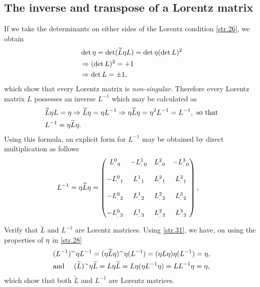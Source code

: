 \begin{small}
\subsection{The inverse and transpose of a Lorentz 
matrix}
If we take the determinants on either sides of the  
Lorentz condition \eqref{str.26}, we obtain
\begin{align}\label{str.30}
&\det {\eta} =\det({\widetilde{L}}{\eta} L) =\det{\ensuremath{{\eta}}}(\det{L})^2 
\notag\\
&\Rightarrow (\det{L} )^2 = +1 \notag \\
&\Rightarrow\det{L}=\pm 1,
\end{align}
which show that every Lorentz matrix is 
\textsl{non-singular}. Therefore every Lorentz matrix 
$L$ possesses an inverse $L^{-1}$ which may be calculated 
as 
\begin{align} \label{str.31}
&\widetilde{L}{\eta} L = {\eta} \Rightarrow \widetilde{L}{\eta} = {\eta}
L^{-1} \Rightarrow {\eta} \widetilde{L} {\eta} = {\eta}^2 L^{-1}
=L^{-1},  \text{ so that}\notag\\
&L^{-1}={\eta}\widetilde{L}{\eta}.
\end{align}
Using this formula, an explicit form for $L^{-1}$ may be 
obtained by direct multiplication as follows 
\begin{align} \label{str.32}
&L^{-1}={\eta}\widetilde{L}{\eta}=\begin{pmatrix}
{\ensuremath{{L}^{0}_{.\;0}}}& -{{L}^{1}_{.\;0}}&
{{L}^{2}_{.\;0}}&-{{L}^{3}_{.\;0}}\\\\
-{{L}^{0}_{.\;1}}& {{L}^{1}_{.\;1}}&
{{L}^{2}_{.\;1}}&{{L}^{3}_{.\;1}}\\\\
-{{L}^{0}_{.\;2}}& {{L}^{1}_{.\;2}}&
{{L}^{2}_{.\;2}}&{{L}^{3}_{.\;2}}\\\\
-{{L}^{0}_{.\;3}}& {{L}^{1}_{.\;3}}&
{{L}^{2}_{.\;3}}&{{L}^{3}_{.\;3}}
\end{pmatrix},
\end{align}

\exm Verify that $\tilde{L}$ and $L^{-1}$ are Lorentz 
matrices. 
\soln Using \eqref{str.31}, we have, on using the 
properties of ${\eta}$ in \eqref{str.28}
\begin{align*}
&(L^{-1})^\sim {\eta} L^{-1}= ({\eta}\widetilde{L}{\eta})^\sim{\eta}
(L^{-1})= ({\eta} L{\eta}){\eta}(L^{-1})={\eta},
\notag\\& \text{and }\quad
(\widetilde{L})^\sim
{\eta}\widetilde{L}=L{\eta}\widetilde{L}=L{\eta}({\eta} L^{-1}{\eta})=L
L^{-1}{\eta}={\eta},
\end{align*}
which show that both $\tilde{L}$ and $L^{-1}$ are Lorentz
matrices.\ebx


\end{small}
